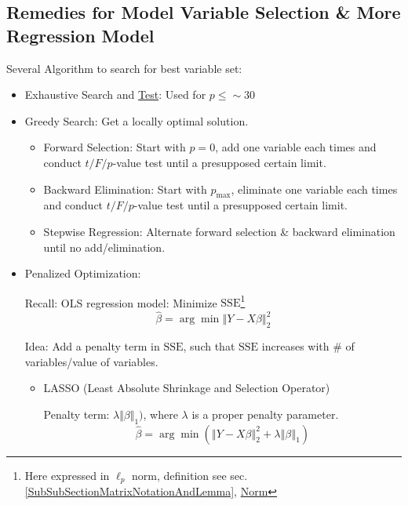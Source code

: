 \subsection{Remedies for Model Variable Selection \& More Regression Model}
    Several Algorithm to search for best variable set:
\begin{itemize}[topsep=2pt,itemsep=0pt]
\item Exhaustive Search and \hyperlink{ModelValidationCriteria}{Test}: Used for $ p\leq \sim 30 $
\item Greedy Search: Get a locally optimal solution.
\begin{itemize}[topsep=2pt,itemsep=2pt]
    \item Forward Selection: Start with $ p=0 $, add one variable each times and conduct $ t/F/p $-value test until a presupposed certain limit.
    \item Backward Elimination: Start with $ p_\mathrm{max} $, eliminate one variable each times and conduct $ t/F/p $-value test until a presupposed certain limit.
    \item Stepwise Regression: Alternate forward selection \& backward elimination until no add/elimination.
\end{itemize}

\item Penalized Optimization: 

Recall: OLS regression model: Minimize $ \mathrm{SSE}  $\footnote{Here expressed in $ \ell_p  $ norm, definition see sec.\ref{SubSubSectionMatrixNotationAndLemma}, \hyperlink{NormDefinition}{Norm}}
\begin{equation}
    \hat{\beta }=\arg\min \left\Vert Y-X\beta \right\Vert _2 ^2
\end{equation}

Idea: Add a penalty term in $ \mathrm{SSE} $, such that $ \mathrm{SSE} $ increases with \# of variables/value of variables.



\begin{itemize}[topsep=2pt,itemsep=2pt]  
\item LASSO (Least Absolute Shrinkage and Selection Operator)
     
Penalty term: $ \lambda\Vert \beta \Vert _1) $, where $ \lambda  $ is a proper penalty parameter.
\begin{equation}
    \hat{\beta }=\arg\min (\left\Vert Y-X\beta \right\Vert _2 ^2+\lambda\left\Vert \beta \right\Vert _1)
\end{equation}


\end{itemize}
\end{itemize}
